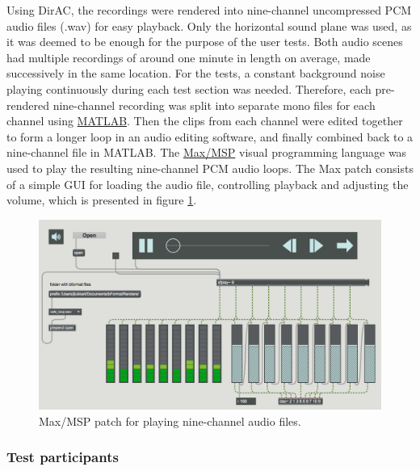 \documentclass[english, 12pt, a4paper, pdftex, elec, utf8]{aaltothesis}
\begin{document}
Using DirAC, the recordings were rendered into nine-channel uncompressed PCM audio files (.wav) for easy playback. Only the horizontal sound plane was used, as it was deemed to be enough for the purpose of the user tests. Both audio scenes had multiple recordings of around one minute in length on average, made successively in the same location. For the tests, a constant background noise playing continuously during each test section was needed. Therefore, each pre-rendered nine-channel recording was split into separate mono files for each channel using \href{https://se.mathworks.com/products/matlab.html}{MATLAB}. Then the clips from each channel were edited together to form a longer loop in an audio editing software, and finally combined back to a nine-channel file in MATLAB. The \href{https://cycling74.com/products/max/}{Max/MSP} visual programming language was used to play the resulting nine-channel PCM audio loops. The Max patch consists of a simple GUI for loading the audio file, controlling playback and adjusting the volume, which is presented in figure \ref{fig:max}. \\
\begin{figure}[h]
	\centering
	\includegraphics[width=\textwidth]{max.png}
	\caption{Max/MSP patch for playing nine-channel audio files.}
	\label{fig:max} 
\end{figure}

\subsubsection{Test participants}
\end{document}
